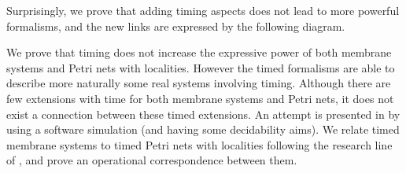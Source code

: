 \documentclass{eptcs}
\begin{document}
\medskip

\noindent Surprisingly, we prove that adding timing aspects does
not lead to more powerful formalisms, and the new links are expressed
by the following diagram.

\medskip

\begin{center}
\end{center}

\medskip

We prove that timing does not increase the expressive power of both membrane
systems and Petri nets with localities. However the timed formalisms are able
to describe more naturally some real systems involving timing. Although there
are few extensions with time for both membrane systems and Petri nets, it does
not exist a connection between these timed extensions. An attempt is presented
in \cite{Profir05} by using a software simulation (and having some decidability
aims). We relate timed membrane systems to timed Petri nets with localities
following the research line of \cite{Kleijn06}, and prove an operational
correspondence between them.
\end{document}

